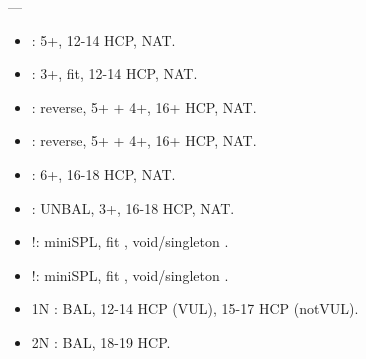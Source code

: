 \documentclass[12pt,twoside,a5paper]{report}%
\begin{document}

	----
	\begin{itemize}
	\renewcommand{\labelitemi}{}
	\item {} : 5+\cl{}, 12-14 HCP, NAT.
	\item {} : 3+\di{}, fit, 12-14 HCP, NAT.
	\item {} : reverse, 5+\cl{} + 4+\he{}, 16+ HCP, NAT.
	\item {} : reverse, 5+\cl{} + 4+\sp{}, 16+ HCP, NAT.
	\item {} : 6+\cl{}, 16-18 HCP, NAT.
	\item {} : UNBAL, 3+\di{}, 16-18 HCP, NAT.
	\item {}!: miniSPL, fit \di{}, void/singleton \he{}.
	\item {}!: miniSPL, fit \di{}, void/singleton \sp{}.
	\item 1N : BAL, 12-14 HCP (VUL), 15-17 HCP (notVUL).
	\item 2N : BAL, 18-19 HCP.
	\end{itemize}
\end{document}
